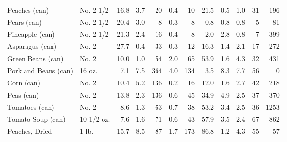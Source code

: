 \documentclass[
  ignorenonframetext,
]{beamer}
\begin{document}
\begin{frame}[fragile]
\begin{tabular}{llrrrrrrrrrr}
Peaches (can)           &   No. 2 1/2 &                16.8 &       3.7 &           20 &          0.4 &         10 &            21.5 &            0.5 &              1.0 &           31 &                 196 \\
Pears (can)             &   No. 2 1/2 &                20.4 &       3.0 &            8 &          0.3 &          8 &             0.8 &            0.8 &              0.8 &            5 &                  81 \\
Pineapple (can)         &   No. 2 1/2 &                21.3 &       2.4 &           16 &          0.4 &          8 &             2.0 &            2.8 &              0.8 &            7 &                 399 \\
Asparagus (can)         &       No. 2 &                27.7 &       0.4 &           33 &          0.3 &         12 &            16.3 &            1.4 &              2.1 &           17 &                 272 \\
Green Beans (can)       &       No. 2 &                10.0 &       1.0 &           54 &          2.0 &         65 &            53.9 &            1.6 &              4.3 &           32 &                 431 \\
Pork and Beans (can)    &      16 oz. &                 7.1 &       7.5 &          364 &          4.0 &        134 &             3.5 &            8.3 &              7.7 &           56 &                   0 \\
Corn (can)              &       No. 2 &                10.4 &       5.2 &          136 &          0.2 &         16 &            12.0 &            1.6 &              2.7 &           42 &                 218 \\
Peas (can)              &       No. 2 &                13.8 &       2.3 &          136 &          0.6 &         45 &            34.9 &            4.9 &              2.5 &           37 &                 370 \\
Tomatoes (can)          &       No. 2 &                 8.6 &       1.3 &           63 &          0.7 &         38 &            53.2 &            3.4 &              2.5 &           36 &                1253 \\
Tomato Soup (can)       &  10 1/2 oz. &                 7.6 &       1.6 &           71 &          0.6 &         43 &            57.9 &            3.5 &              2.4 &           67 &                 862 \\
Peaches, Dried          &       1 lb. &                15.7 &       8.5 &           87 &          1.7 &        173 &            86.8 &            1.2 &              4.3 &           55 &                  57 \\

\end{tabular}
\end{frame}
\end{document}
